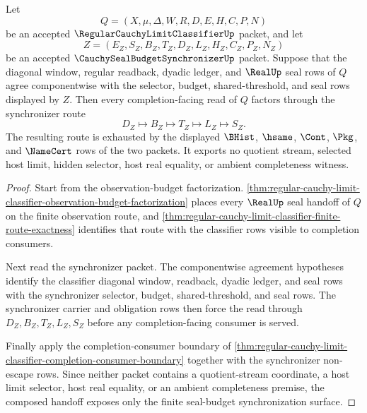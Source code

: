 \begin{theorem}
\label{thm:regular-cauchy-limit-classifier-synchronizer-factorization}
Let
$$
Q=(X,\mu,\Delta,W,R,D,E,H,C,P,N)
$$
be an accepted $\RegularCauchyLimitClassifierUp$ packet, and let
$$
Z=(E_Z,S_Z,B_Z,T_Z,D_Z,L_Z,H_Z,C_Z,P_Z,N_Z)
$$
be an accepted $\CauchySealBudgetSynchronizerUp$ packet. Suppose that the diagonal window, regular readback, dyadic ledger, and $\RealUp$ seal rows of $Q$ agree componentwise with the selector, budget, shared-threshold, and seal rows displayed by $Z$. Then every completion-facing read of $Q$ factors through the synchronizer route
$$
D_Z \longmapsto B_Z \longmapsto T_Z \longmapsto L_Z \longmapsto S_Z.
$$
The resulting route is exhausted by the displayed $\BHist$, $\hsame$, $\Cont$, $\Pkg$, and $\NameCert$ rows of the two packets. It exports no quotient stream, selected host limit, hidden selector, host real equality, or ambient completeness witness.
\end{theorem}
\begin{proof}
Start from the observation-budget factorization. \autoref{thm:regular-cauchy-limit-classifier-observation-budget-factorization} places every $\RealUp$ seal handoff of $Q$ on the finite observation route, and \autoref{thm:regular-cauchy-limit-classifier-finite-route-exactness} identifies that route with the classifier rows visible to completion consumers.

Next read the synchronizer packet. The componentwise agreement hypotheses identify the classifier diagonal window, readback, dyadic ledger, and seal rows with the synchronizer selector, budget, shared-threshold, and seal rows. The synchronizer carrier and obligation rows then force the read through $D_Z,B_Z,T_Z,L_Z,S_Z$ before any completion-facing consumer is served.

Finally apply the completion-consumer boundary of \autoref{thm:regular-cauchy-limit-classifier-completion-consumer-boundary} together with the synchronizer non-escape rows. Since neither packet contains a quotient-stream coordinate, a host limit selector, host real equality, or an ambient completeness premise, the composed handoff exposes only the finite seal-budget synchronization surface.
\end{proof}

